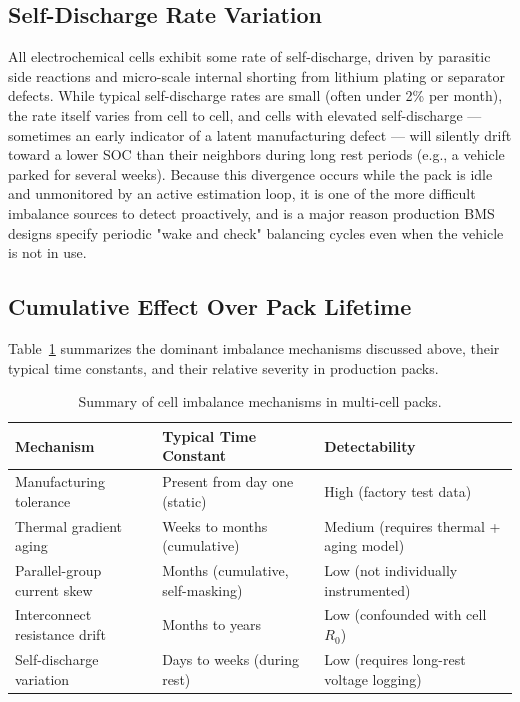 \subsection{Self-Discharge Rate Variation}
\label{subsec:14_self_discharge}

All electrochemical cells exhibit some rate of self-discharge, driven by parasitic side reactions and micro-scale internal shorting from lithium plating or separator defects. While typical self-discharge rates are small (often under 2\% per month), the rate itself varies from cell to cell, and cells with elevated self-discharge — sometimes an early indicator of a latent manufacturing defect — will silently drift toward a lower SOC than their neighbors during long rest periods (e.g., a vehicle parked for several weeks). Because this divergence occurs while the pack is idle and unmonitored by an active estimation loop, it is one of the more difficult imbalance sources to detect proactively, and is a major reason production BMS designs specify periodic "wake and check" balancing cycles even when the vehicle is not in use.

\subsection{Cumulative Effect Over Pack Lifetime}
\label{subsec:14_cumulative}

Table~\ref{tab:14_imbalance_sources} summarizes the dominant imbalance mechanisms discussed above, their typical time constants, and their relative severity in production packs.

\begin{table}[htbp]
\centering
\caption{Summary of cell imbalance mechanisms in multi-cell packs.}
\label{tab:14_imbalance_sources}
\renewcommand{\arraystretch}{1.4}
\begin{tabularx}{\textwidth}{@{}l X X@{}}
\toprule
\textbf{Mechanism} & \textbf{Typical Time Constant} & \textbf{Detectability} \\
\midrule
Manufacturing tolerance & Present from day one (static) & High (factory test data) \\
Thermal gradient aging & Weeks to months (cumulative) & Medium (requires thermal + aging model) \\
Parallel-group current skew & Months (cumulative, self-masking) & Low (not individually instrumented) \\
Interconnect resistance drift & Months to years & Low (confounded with cell $R_0$) \\
Self-discharge variation & Days to weeks (during rest) & Low (requires long-rest voltage logging) \\
\bottomrule
\end{tabularx}
\end{table}

